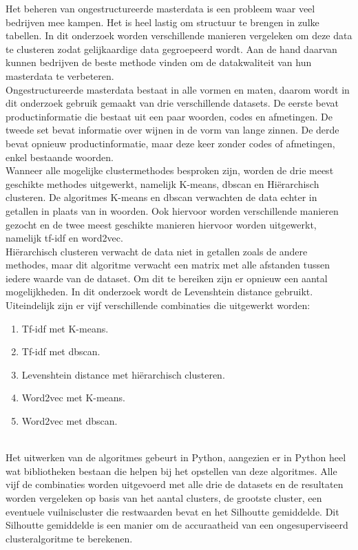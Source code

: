 Het beheren van ongestructureerde masterdata is een probleem waar veel bedrijven mee kampen. Het is heel lastig om structuur te brengen in zulke tabellen. In dit onderzoek worden verschillende manieren vergeleken om deze data te clusteren zodat gelijkaardige data gegroepeerd wordt. Aan de hand daarvan kunnen bedrijven de beste methode vinden om de datakwaliteit van hun masterdata te verbeteren.
\\\indent
Ongestructureerde masterdata bestaat in alle vormen en maten, daarom wordt in dit onderzoek gebruik gemaakt van drie verschillende datasets. De eerste bevat productinformatie die bestaat uit een paar woorden, codes en afmetingen. De tweede set bevat informatie over wijnen in de vorm van lange zinnen. De derde bevat opnieuw productinformatie, maar deze keer zonder codes of afmetingen, enkel bestaande woorden.
\\\indent
Wanneer alle mogelijke clustermethodes besproken zijn, worden de drie meest geschikte methodes uitgewerkt, namelijk K-means, dbscan en Hiërarchisch clusteren. De algoritmes K-means en dbscan verwachten de data echter in getallen in plaats van in woorden. Ook hiervoor worden verschillende manieren gezocht en de twee meest geschikte manieren hiervoor worden uitgewerkt, namelijk tf-idf en word2vec.
\\\indent
Hiërarchisch clusteren verwacht de data niet in getallen zoals de andere methodes, maar dit algoritme verwacht een matrix met alle afstanden tussen iedere waarde van de dataset. Om dit te bereiken zijn er opnieuw een aantal mogelijkheden. In dit onderzoek wordt de Levenshtein distance gebruikt.
\\\indent
Uiteindelijk zijn er vijf verschillende combinaties die uitgewerkt worden:
\begin{enumerate}
    \item Tf-idf met K-means.
    \item Tf-idf met dbscan.
    \item Levenshtein distance met hiërarchisch clusteren.
    \item Word2vec met K-means.
    \item Word2vec met dbscan.
\end{enumerate}
\\\indent
Het uitwerken van de algoritmes gebeurt in Python, aangezien er in Python heel wat bibliotheken bestaan die helpen bij het opstellen van deze algoritmes. Alle vijf de combinaties worden uitgevoerd met alle drie de datasets en de resultaten worden vergeleken op basis van het aantal clusters, de grootste cluster, een eventuele vuilniscluster die restwaarden bevat en het Silhoutte gemiddelde. Dit Silhoutte gemiddelde is een manier om de accuraatheid van een ongesuperviseerd clusteralgoritme te berekenen.
